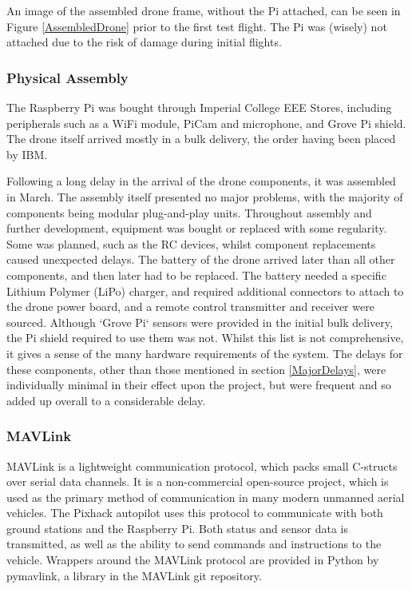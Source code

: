\documentclass{article}
\begin{document}
An image of the assembled drone frame, without the Pi attached, can be seen in Figure \ref{AssembledDrone} prior to the first test flight. The Pi was (wisely) not attached due to the risk of damage during initial flights.

\subsubsection{Physical Assembly}
The Raspberry Pi was bought through Imperial College EEE Stores, including peripherals such as a WiFi module, PiCam and microphone, and Grove Pi shield. The drone itself arrived mostly in a bulk delivery, the order having been placed by IBM. 

Following a long delay in the arrival of the drone components, it was assembled in March. The assembly itself presented no major problems, with the majority of components being modular plug-and-play units. Throughout assembly and further development, equipment was bought or replaced with some regularity. Some was planned, such as the RC devices, whilst component replacements caused unexpected delays. The battery of the drone arrived later than all other components, and then later had to be replaced. The battery needed a specific Lithium Polymer (LiPo) charger, and required additional connectors to attach to the drone power board, and a remote control transmitter and receiver were sourced. Although `Grove Pi` sensors were provided in the initial bulk delivery, the Pi shield required to use them was not. Whilst this list is not comprehensive, it gives a sense of the many hardware requirements of the system. The delays for these components, other than those mentioned in section \ref{MajorDelays}, were individually minimal in their effect upon the project, but were frequent and so added up overall to a considerable delay. 

\subsubsection{MAVLink}
MAVLink is a lightweight communication protocol, which packs small C-structs over serial data channels\cite{qGroundMavlink}. It is a non-commercial open-source project, which is used as the primary method of communication in many modern unmanned aerial vehicles. The Pixhack autopilot uses this protocol to communicate with both ground stations and the Raspberry Pi. Both status and sensor data is transmitted, as well as the ability to send commands and instructions to the vehicle. Wrappers around the MAVLink protocol are provided in Python by pymavlink, a library in the MAVLink git repository.
\end{document}

